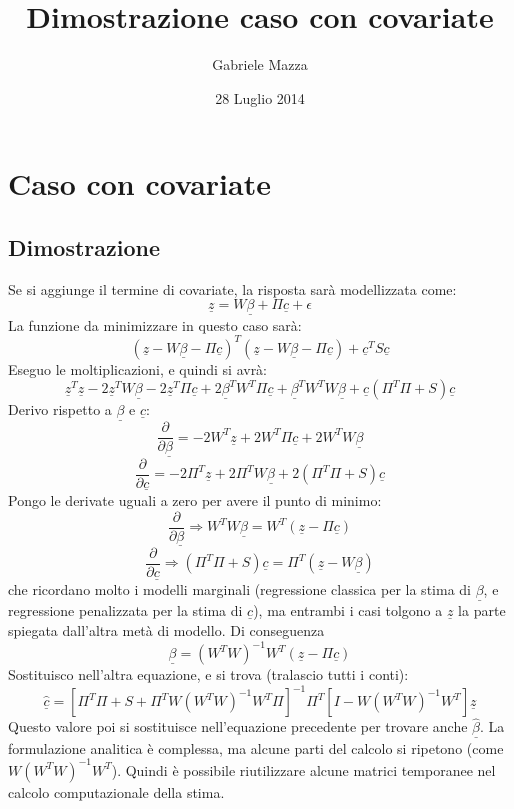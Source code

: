 \documentclass[a4paper,12pt]{report}				%
\date{28 Luglio 2014}
\author{Gabriele Mazza}
\title{Dimostrazione caso con covariate}
\begin{document}

\chapter{Caso con covariate}

\section{Dimostrazione}
Se si aggiunge il termine di covariate, la risposta sarà modellizzata come:
$$
\underline{z}=W\underline{\beta} + \Pi\underline{c} + \epsilon
$$
La funzione da minimizzare in questo caso sarà:
$$
(\underline{z}-W\underline{\beta}-\Pi\underline{c})^T(\underline{z}-W\underline{\beta}-\Pi\underline{c})+ \underline{c}^TS\underline{c}
$$
Eseguo le moltiplicazioni, e quindi si avrà:
$$
\underline{z}^T\underline{z} -2\underline{z}^TW\underline{\beta} -2\underline{z}^T\Pi\underline{c}
+2\underline{\beta}^TW^T\Pi\underline{c} + \underline{\beta}^TW^TW\underline{\beta}
+\underline{c}(\Pi^T\Pi+S)\underline{c}
$$
Derivo rispetto a $\underline{\beta}$ e $\underline{c}$:
$$
\frac{\partial}{\partial\underline{\beta}}=-2W^T\underline{z} +2W^T\Pi\underline{c} +2W^TW\underline{\beta}
$$
$$
\frac{\partial}{\partial\underline{c}}=-2\Pi^T\underline{z} +2\Pi^TW\underline{\beta} +2(\Pi^T\Pi+S)\underline{c}
$$
Pongo le derivate uguali a zero per avere il punto di minimo:
$$
\frac{\partial}{\partial\underline{\beta}}\Rightarrow
W^TW\underline{\beta} = W^T(\underline{z}-\Pi\underline{c})
$$
$$
\frac{\partial}{\partial\underline{c}}\Rightarrow
(\Pi^T\Pi+S)\underline{c} = \Pi^T(\underline{z}-W\underline{\beta})
$$
che ricordano molto i modelli marginali (regressione classica per la stima di $\underline{\beta}$, e regressione penalizzata per la stima di $\underline{c}$), ma entrambi i casi tolgono a $\underline{z}$ la parte spiegata dall'altra metà di modello.
\newline
Di conseguenza
$$
\underline{\beta}=(W^TW)^{-1}W^T(\underline{z}-\Pi\underline{c})
$$
Sostituisco nell'altra equazione, e si trova (tralascio tutti i conti):
$$
\underline{\hat{c}}=[\Pi^T\Pi+S+\Pi^TW(W^TW)^{-1}W^T\Pi]^{-1}\Pi^T[I-W(W^TW)^{-1}W^T]\underline{z}
$$
Questo valore poi si sostituisce nell'equazione precedente per trovare anche $\underline{\hat{\beta}}$.
La formulazione analitica è complessa, ma alcune parti del calcolo si ripetono (come $W(W^TW)^{-1}W^T$). Quindi è possibile riutilizzare alcune matrici temporanee nel calcolo computazionale della stima.
\end{document}
